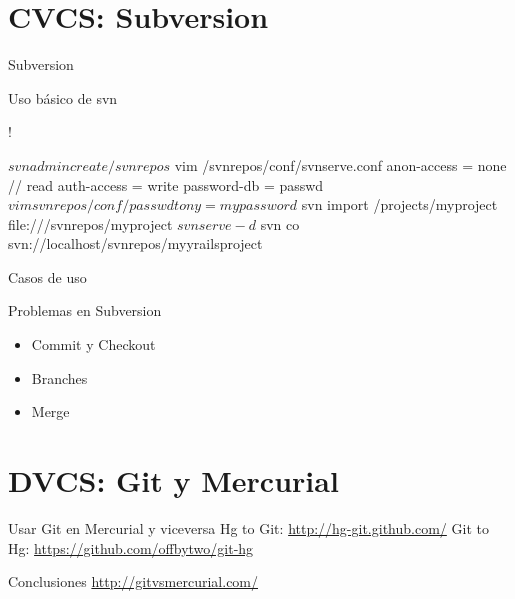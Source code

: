 \documentclass[spanish]{beamer}
\begin{document}
        \section{CVCS: Subversion}
        
       \begin{frame}{Subversion} 
          \end{frame}
       \begin{frame}{Uso básico de svn}
          \end{frame}
       \begin{frame}[fragile]!
%
\begin{semiverbatim}
$ svnadmin create /svnrepos
$ vim /svnrepos/conf/svnserve.conf
 anon-access = none // read
 auth-access = write
 password-db = passwd
$ vim svnrepos/conf/passwd
 tony = mypassword
$ svn import /projects/myproject 
                 file:///svnrepos/myproject
$ svnserve -d
$ svn co 
    svn://localhost/svnrepos/myyrailsproject
\end{semiverbatim}
        \end{frame}
        \begin{frame}{Casos de uso}
         \end{frame}
        \begin{frame}{Problemas en Subversion}
           \begin{itemize}
              \item Commit y Checkout
              \item Branches
              \item Merge
           \end{itemize}
	\end{frame}
        \section{DVCS: Git y Mercurial}

               
        \begin{frame}{Usar Git en Mercurial y viceversa} 
        Hg to Git: \url{http://hg-git.github.com/}
        Git to Hg: \url{https://github.com/offbytwo/git-hg}
        \end{frame}
	\begin{frame}{Conclusiones}
          \url{http://gitvsmercurial.com/}
        \end{frame}
       
\end{document}
